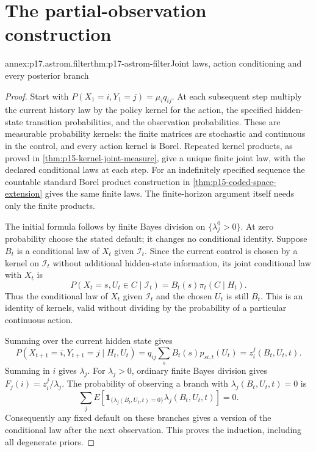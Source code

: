 \section{The partial-observation construction}
\label{sec:annex-p17-partial-observation-decisions}

\begin{annexitem}{annex:p17.astrom.filter}{thm:p17-astrom-filter}{Joint laws, action conditioning and every posterior branch}
\begin{proof}
Start with \(P(X_1=i,Y_1=j)=\mu_iq_{ij}\).
At each subsequent step multiply the current history law by
the policy kernel for the action, the specified hidden-state
transition probabilities, and the observation probabilities.
These are measurable probability kernels: the finite matrices
are stochastic and continuous in the control, and every action
kernel is Borel. Repeated kernel products, as proved in
\cref{thm:p15-kernel-joint-measure}, give a unique finite joint
law, with the declared conditional laws at each step.
For an indefinitely specified sequence the countable
standard Borel product construction in
\cref{thm:p15-coded-space-extension} gives the same finite laws.
The finite-horizon argument itself needs only the finite products.

The initial formula follows by finite Bayes division on
\(\{\lambda_j^0>0\}\). At zero probability choose the stated
default; it changes no conditional identity.
Suppose \(B_t\) is a conditional law of \(X_t\) given
\(\mathcal I_t\). Since the current control is chosen by
a kernel on \(\mathcal I_t\) without additional hidden-state
information, its joint conditional law with \(X_t\) is
\[
        P(X_t=s,U_t\in C\mid\mathcal I_t)
                        =B_t(s)\pi_t(C\mid H_t).
\]
Thus the conditional law of \(X_t\) given
\(\mathcal I_t\) and the chosen \(U_t\) is still \(B_t\).
This is an identity of kernels, valid without dividing
by the probability of a particular continuous action.

Summing over the current hidden state gives
\[
 P(X_{t+1}=i,Y_{t+1}=j\mid H_t,U_t)
          =q_{ij}\sum_s B_t(s)p_{si,t}(U_t)
          =z_i^j(B_t,U_t,t).
\]
Summing in \(i\) gives \(\lambda_j\).
For \(\lambda_j>0\), ordinary finite Bayes division gives
\(F_j(i)=z_i^j/\lambda_j\).
The probability of observing a branch with
\(\lambda_j(B_t,U_t,t)=0\) is
\[
 \sum_j E[\mathbf1_{\{\lambda_j(B_t,U_t,t)=0\}}
                                      \lambda_j(B_t,U_t,t)]=0.
\]
Consequently any fixed default on these branches gives
a version of the conditional law after the next observation.
This proves the induction, including all degenerate priors.


\end{proof}
\end{annexitem}
